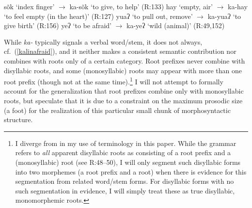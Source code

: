 \documentclass[output=paper]{langscibook}
\begin{document}
\ea\label{kalinrps}  
\ea s\~ok `index finger' $\rightarrow$ {ka}-s\~ok `to give, to help' \hfill (R:133)
\ex hay `empty, air' $\rightarrow$ {ka}-hay `to feel empty (in the heart)' \hfill (R:127)
\ex yuaʔ `to pull out, remove' $\rightarrow$ {ka}-yuaʔ `to give birth' \hfill (R:156)
\ex yeʔ `to be afraid' $\rightarrow$ {ka}-yeʔ `wild (animal)' \hfill (R:49,152)\label{kalinafraid}
\z
\z

\noindent While \textit{ka-} typically signals a verbal word/stem, it does not always, cf.\ (\ref{kalinafraid}), and it neither makes a consistent semantic contribution nor combines with roots only of a certain category. Root prefixes never combine with disyllabic roots, and some (monosyllabic) roots may appear with more than one root prefix (though not at the same time).\footnote{I diverge from \citealt{Rad81} in my use of terminology in this paper. While the grammar refers to \textit{all} apparent disyllabic roots as consisting of a root prefix and a (monosyllabic) root (see R:48--50), I will only segment such disyllabic forms into two morphemes (a root prefix and a root) when there is evidence for this segmentation from related word/stem forms. For disyllabic forms with no such segmentation in evidence, I will simply treat these as true disyllabic, monomorphemic roots.} I will not attempt to formally account for the generalization that root prefixes combine only with monosyllabic roots, but speculate that it is due to a constraint on the maximum prosodic size (a foot) for the realization of this particular small chunk of morphosyntactic structure.
\end{document}
